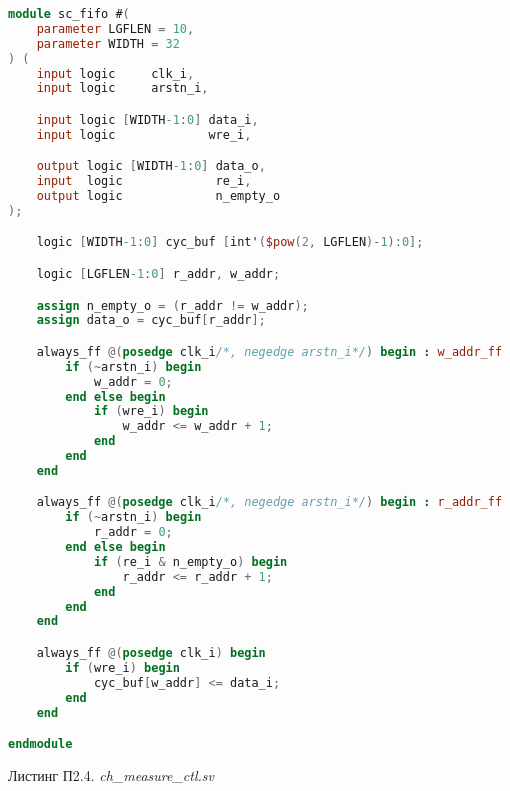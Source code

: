 \begin{lstlisting}[language=Verilog]
module sc_fifo #(
    parameter LGFLEN = 10,
    parameter WIDTH = 32
) (
    input logic     clk_i,
    input logic     arstn_i,

    input logic [WIDTH-1:0] data_i,
    input logic             wre_i,

    output logic [WIDTH-1:0] data_o,
    input  logic             re_i,
    output logic             n_empty_o
);

    logic [WIDTH-1:0] cyc_buf [int'($pow(2, LGFLEN)-1):0];

    logic [LGFLEN-1:0] r_addr, w_addr;

    assign n_empty_o = (r_addr != w_addr);
    assign data_o = cyc_buf[r_addr];

    always_ff @(posedge clk_i/*, negedge arstn_i*/) begin : w_addr_ff
        if (~arstn_i) begin
            w_addr = 0;
        end else begin
            if (wre_i) begin
                w_addr <= w_addr + 1;
            end
        end
    end

    always_ff @(posedge clk_i/*, negedge arstn_i*/) begin : r_addr_ff
        if (~arstn_i) begin
            r_addr = 0;
        end else begin
            if (re_i & n_empty_o) begin
                r_addr <= r_addr + 1;
            end
        end
    end

    always_ff @(posedge clk_i) begin
        if (wre_i) begin
            cyc_buf[w_addr] <= data_i;
        end
    end

endmodule
\end{lstlisting}

\begin{flushright}
Листинг П2.4. \emph{ch\_measure\_ctl.sv}
\end{flushright}

